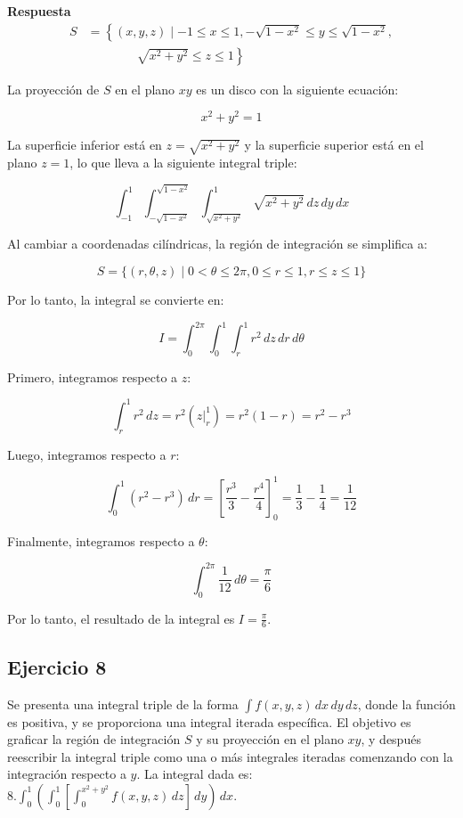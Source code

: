\documentclass{report}
\begin{document}
\textbf{Respuesta}
\[
\begin{aligned}
S &= \left\{(x, y, z) \mid -1 \leq x \leq 1, -\sqrt{1-x^{2}} \leq y \leq \sqrt{1-x^{2}}, \right. \\
& \quad \quad \quad \quad \left. \sqrt{x^{2}+y^{2}} \leq z \leq 1 \right\}
\end{aligned}
\]

La proyección de $S$ en el plano $xy$ es un disco con la siguiente ecuación:

\[
x^{2}+y^{2}=1
\]

La superficie inferior está en $z=\sqrt{x^{2}+y^{2}}$ y la superficie superior está en el plano $z=1$, lo que lleva a la siguiente integral triple:

\[
\int_{-1}^{1} \int_{-\sqrt{1-x^{2}}}^{\sqrt{1-x^{2}}} \int_{\sqrt{x^{2}+y^{2}}}^{1} \sqrt{x^{2}+y^{2}} \,dz \,dy \,dx
\]

Al cambiar a coordenadas cilíndricas, la región de integración se simplifica a:

\[
S=\{(r, \theta, z) \mid 0 < \theta \leq 2\pi, 0 \leq r \leq 1, r \leq z \leq 1\}
\]

Por lo tanto, la integral se convierte en:

\[
I = \int_{0}^{2\pi} \int_{0}^{1} \int_{r}^{1} r^{2} \,dz \,dr \,d\theta
\]

Primero, integramos respecto a $z$:

\[
\int_{r}^{1} r^{2} \,dz = r^{2} \left(z \bigg|_{r}^{1} \right) = r^{2}(1-r) = r^{2} - r^{3}
\]

Luego, integramos respecto a $r$:

\[
\int_{0}^{1} (r^{2} - r^{3}) \,dr = \left[\frac{r^{3}}{3} - \frac{r^{4}}{4} \right]_{0}^{1} = \frac{1}{3} - \frac{1}{4} = \frac{1}{12}
\]

Finalmente, integramos respecto a $\theta$:

\[
\int_{0}^{2\pi} \frac{1}{12} \,d\theta = \frac{\pi}{6}
\]

Por lo tanto, el resultado de la integral es $I = \frac{\pi}{6}$.\subsection{Ejercicio 8}
Se presenta una integral triple de la forma $ \int f(x, y, z) \, d x \, d y \, d z $, donde la función es positiva, y se proporciona una integral iterada específica. El objetivo es graficar la región de integración $ S $ y su proyección en el plano $ xy $, y después reescribir la integral triple como una o más integrales iteradas comenzando con la integración respecto a $ y $. La integral dada es: $8. \int_{0}^{1}\left(\int_{0}^{1}\left[\int_{0}^{x^{2}+y^{2}} f(x, y, z) \, d z\right] \, d y\right) \, d x.$
\end{document}
